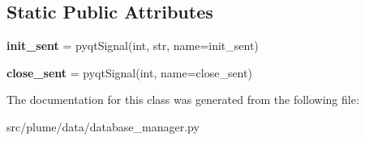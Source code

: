 \subsection*{Static Public Attributes}
\begin{DoxyCompactItemize}
\item 
{\bfseries init\+\_\+sent} = pyqt\+Signal(int, str, name=\textquotesingle{}init\+\_\+sent\textquotesingle{})\hypertarget{classplume-creator_1_1src_1_1plume_1_1data_1_1database__manager_1_1_database_manager_a91519dbc94df698a4401c9211a6cc7bd}{}\label{classplume-creator_1_1src_1_1plume_1_1data_1_1database__manager_1_1_database_manager_a91519dbc94df698a4401c9211a6cc7bd}

\item 
{\bfseries close\+\_\+sent} = pyqt\+Signal(int, name=\textquotesingle{}close\+\_\+sent\textquotesingle{})\hypertarget{classplume-creator_1_1src_1_1plume_1_1data_1_1database__manager_1_1_database_manager_a6dc0faccf8fc0eee837683b20a1c2c90}{}\label{classplume-creator_1_1src_1_1plume_1_1data_1_1database__manager_1_1_database_manager_a6dc0faccf8fc0eee837683b20a1c2c90}

\end{DoxyCompactItemize}


The documentation for this class was generated from the following file\+:\begin{DoxyCompactItemize}
\item 
src/plume/data/database\+\_\+manager.\+py\end{DoxyCompactItemize}
